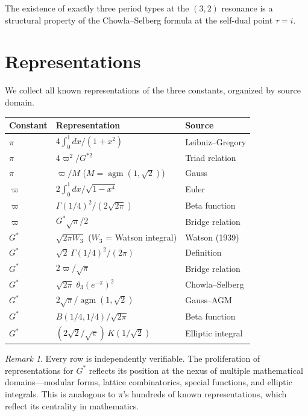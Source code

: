 \documentclass[12pt]{article}
\theoremstyle{definition}
\theoremstyle{remark}
\newtheorem{remark}[theorem]{Remark}
\begin{document}
The existence of exactly three period types at the $(3,2)$ resonance is a structural property of the Chowla--Selberg formula at the self-dual point $\tau = i$.

\section{Representations}
\label{sec:reps}

We collect all known representations of the three constants, organized by source domain.

\begin{center}
\renewcommand{\arraystretch}{1.4}
\begin{tabular}{@{}lll@{}}
\toprule
\textbf{Constant} & \textbf{Representation} & \textbf{Source} \\
\midrule
$\pi$ & $4\!\int_0^1\! dx/(1{+}x^2)$ & Leibniz--Gregory \\
$\pi$ & $4\varpi^2/G^{*2}$ & Triad relation \\
$\pi$ & $\varpi/M$ \; ($M = \operatorname{agm}(1,\sqrt{2})$) & Gauss \\[4pt]
$\varpi$ & $2\!\int_0^1\! dx/\sqrt{1{-}x^4}$ & Euler \\
$\varpi$ & $\Gamma(1/4)^2/(2\sqrt{2\pi})$ & Beta function \\
$\varpi$ & $G^*\sqrt{\pi}/2$ & Bridge relation \\[4pt]
$G^*$ & $\sqrt{2\pi W_3}$ \; ($W_3$ = Watson integral) & Watson (1939) \\
$G^*$ & $\sqrt{2}\,\Gamma(1/4)^2/(2\pi)$ & Definition \\
$G^*$ & $2\varpi/\sqrt{\pi}$ & Bridge relation \\
$G^*$ & $\sqrt{2\pi}\;\theta_3(e^{-\pi})^2$ & Chowla--Selberg \\
$G^*$ & $2\sqrt{\pi}/\operatorname{agm}(1,\sqrt{2})$ & Gauss--AGM \\
$G^*$ & $B(1/4,1/4)/\sqrt{2\pi}$ & Beta function \\
$G^*$ & $(2\sqrt{2}/\sqrt{\pi})\,K(1/\sqrt{2})$ & Elliptic integral \\
\bottomrule
\end{tabular}
\end{center}

\begin{remark}
Every row is independently verifiable. The proliferation of representations for $G^*$ reflects its position at the nexus of multiple mathematical domains---modular forms, lattice combinatorics, special functions, and elliptic integrals. This is analogous to $\pi$'s hundreds of known representations, which reflect its centrality in mathematics.
\end{remark}
\end{document}
